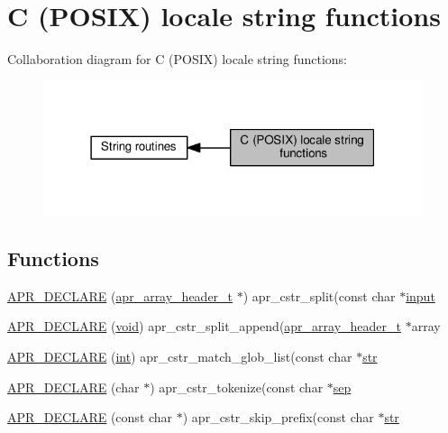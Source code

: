 \hypertarget{group__apr__cstr}{}\section{C (P\+O\+S\+IX) locale string functions}
\label{group__apr__cstr}
Collaboration diagram for C (P\+O\+S\+IX) locale string functions\+:
\nopagebreak
\begin{figure}[H]
\begin{center}
\leavevmode
\includegraphics[width=315pt]{group__apr__cstr}
\end{center}
\end{figure}
\subsection*{Functions}
\begin{DoxyCompactItemize}
\item 
\hyperlink{group__apr__cstr_ga19f812ecbdcfe89884fee19176446cc7}{A\+P\+R\+\_\+\+D\+E\+C\+L\+A\+RE} (\hyperlink{structapr__array__header__t}{apr\+\_\+array\+\_\+header\+\_\+t} $\ast$) apr\+\_\+cstr\+\_\+split(const char $\ast$\hyperlink{perltest_8txt_a1d3f4df61ab6d72e9cfd2de361e2a85b}{input}
\item 
\hyperlink{group__apr__cstr_gae933596da6955a0483cad21fe870df54}{A\+P\+R\+\_\+\+D\+E\+C\+L\+A\+RE} (\hyperlink{group__MOD__ISAPI_gacd6cdbf73df3d9eed42fa493d9b621a6}{void}) apr\+\_\+cstr\+\_\+split\+\_\+append(\hyperlink{structapr__array__header__t}{apr\+\_\+array\+\_\+header\+\_\+t} $\ast$array
\item 
\hyperlink{group__apr__cstr_ga12967ffb805aeecfcdcc16d4f75e2f86}{A\+P\+R\+\_\+\+D\+E\+C\+L\+A\+RE} (\hyperlink{pcre_8txt_a42dfa4ff673c82d8efe7144098fbc198}{int}) apr\+\_\+cstr\+\_\+match\+\_\+glob\+\_\+list(const char $\ast$\hyperlink{group__APR__Util__Bucket__Brigades_ga6a62b60443be1d042194af15ce934193}{str}
\item 
\hyperlink{group__apr__cstr_ga442344ea696aa88544f763619bea2c1c}{A\+P\+R\+\_\+\+D\+E\+C\+L\+A\+RE} (char $\ast$) apr\+\_\+cstr\+\_\+tokenize(const char $\ast$\hyperlink{group__apr__tables_ga37d96adf842aef6b03690e17874c9ed8}{sep}
\item 
\hyperlink{group__apr__cstr_ga600dfde25dc97f659cef814989cff9c5}{A\+P\+R\+\_\+\+D\+E\+C\+L\+A\+RE} (const char $\ast$) apr\+\_\+cstr\+\_\+skip\+\_\+prefix(const char $\ast$\hyperlink{group__APR__Util__Bucket__Brigades_ga6a62b60443be1d042194af15ce934193}{str}
\end{DoxyCompactItemize}
